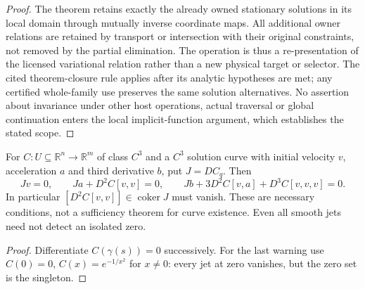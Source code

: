 \documentclass[12pt,a4paper]{article}
\begin{document}
\begin{proof}
The theorem retains exactly the already owned stationary solutions in its
local domain through mutually inverse coordinate maps.  All additional
owner relations are retained by transport or intersection with their original
constraints, not removed by the partial elimination.  The operation is thus
a re-presentation of the licensed variational relation rather than a new
physical target or selector.  The cited theorem-closure rule applies after
its analytic hypotheses are met; any certified whole-family use preserves
the same solution alternatives.  No assertion about invariance under other
host operations, actual traversal or global continuation enters the local
implicit-function argument, which establishes the stated scope.
\end{proof}
\begin{proposition}
\label{p2a:prop:v257-constraint-obstructions}
For $C:U\subseteq\mathbb R^n\to\mathbb R^m$ of class $C^3$ and a $C^3$ solution curve with initial velocity $v$,
acceleration $a$ and third derivative $b$, put $J=DC_q$. Then
\[
 Jv=0,\qquad Ja+D^2C[v,v]=0,\qquad
 Jb+3D^2C[v,a]+D^3C[v,v,v]=0.
\]
In particular $[D^2C[v,v]]\in\operatorname{coker}J$ must vanish.
These are necessary conditions, not a sufficiency theorem for curve
existence. Even all smooth jets need not detect an isolated zero.
\end{proposition}
\begin{proof}
Differentiate $C(\gamma(s))=0$ successively. For the last warning use
$C(0)=0$, $C(x)=e^{-1/x^2}$ for $x\ne0$: every jet at zero vanishes,
but the zero set is the singleton.
\end{proof}
\end{document}
